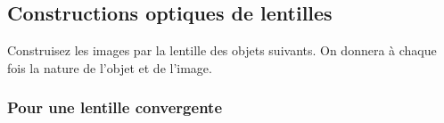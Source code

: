 \documentclass[../../main/main.tex]{subfiles}
\begin{document}
\setcounter{chapter}{2}
\setlength{\columnseprule}{0pt}

\chapter{}

\section{Constructions optiques de lentilles}

Construisez les images par la lentille des objets suivants. On donnera à chaque
fois la nature de l'objet et de l'image.

\subsection{Pour une lentille convergente}
\end{document}
